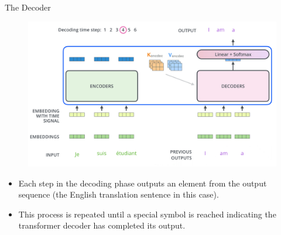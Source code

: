 \documentclass[handout]{beamer}
\begin{document}
\begin{frame}{The Decoder}

     \begin{figure}[h]
        	\includegraphics[scale = 0.28]{pics/transformer_decoder.png}
        \end{figure}  

\begin{scriptsize}
\begin{itemize}

 \item Each step in the decoding phase outputs an element from the output sequence (the English translation sentence in this case). 
 \item This process is repeated until a special symbol is reached indicating the transformer decoder has completed its output.
\end{itemize}

\end{scriptsize}
        
        
\end{frame}
\end{document}
